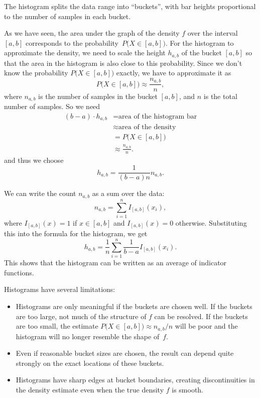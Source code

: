 \documentclass[
  a4paper,
]{article}
\providecommand{\tightlist}{%
  \setlength{\itemsep}{0pt}\setlength{\parskip}{0pt}}
\theoremstyle{definition}
\theoremstyle{definition}
\theoremstyle{definition}
\theoremstyle{definition}
\theoremstyle{remark}
\begin{document}
The histogram splits the data range into ``buckets'', with bar heights
proportional to the number of samples in each bucket.

As we have seen, the area under the graph of the density \(f\) over the
interval \([a, b]\) corresponds to the probability~\(P\bigl(X \in
[a,b]\bigr)\). For the histogram to approximate the density, we need
to scale the height \(h_{a,b}\) of the bucket \([a, b]\) so that the area
in the histogram is also close to this probability. Since we don't
know the probability \(P\bigl(X \in [a,b]\bigr)\) exactly, we have to
approximate it as
\begin{equation*}
  P\bigl(X \in [a,b]\bigr)
  \approx \frac{n_{a,b}}{n},
\end{equation*}
where \(n_{a,b}\) is the number of samples in the bucket \([a,b]\),
and \(n\) is the total number of samples. So we need
\begin{align*}
  (b-a) \cdot h_{a,b}
    &= \mbox{area of the histogram bar} \\
    &\approx \mbox{area of the density} \\
    &= P\bigl(X \in [a,b]\bigr) \\
    &\approx \frac{n_{a,b}}{n}.
\end{align*}
and thus we choose
\begin{equation*}
  h_{a,b}
  = \frac{1}{(b - a) n} n_{a,b}.
\end{equation*}

We can write the count \(n_{a,b}\) as a sum over the data:
\begin{equation*}
  n_{a,b}
  = \sum_{i=1}^n I_{[a,b]}(x_i),
\end{equation*}
where \(I_{[a,b]}(x) = 1\) if \(x \in [a,b]\) and \(I_{[a,b]}(x) = 0\) otherwise.
Substituting this into the formula for the histogram, we get
\begin{equation}
  h_{a,b}
  = \frac{1}{n} \sum_{i=1}^n \frac{1}{b - a} I_{[a,b]}(x_i).
  \label{eq:histogram-indicator}
\end{equation}
This shows that the histogram can be written as an average of indicator
functions.

Histograms have several limitations:

\begin{itemize}
\tightlist
\item
  Histograms are only meaningful if the buckets are chosen well. If
  the buckets are too large, not much of the structure of \(f\) can be
  resolved. If the buckets are too small, the estimate \(P\bigl(X \in
  [a,b]\bigr) \approx n_{a,b}/n\) will be poor and the histogram will
  no longer resemble the shape of~\(f\).
\item
  Even if reasonable bucket sizes are chosen, the result can depend quite
  strongly on the exact locations of these buckets.
\item
  Histograms have sharp edges at bucket boundaries, creating
  discontinuities in the density estimate even when the true density \(f\)
  is smooth.
\end{itemize}
\end{document}
